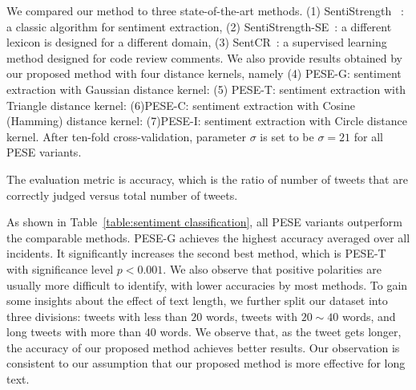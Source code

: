 \documentclass[runningheads]{llncs}
\begin{document}
We compared our method to three state-of-the-art methods. (1) SentiStrength ~\cite{sentistrength2010}: a classic algorithm for sentiment extraction, (2) SentiStrength-SE~\cite{Rakibul2017SentiStrength-SE}: a different lexicon is designed for a different domain, (3) SentCR~\cite{Ahmed2017SentiCR}:  a supervised learning method designed for code review comments. 
We also provide results obtained by our proposed method with four distance kernels, namely (4) PESE-G: sentiment extraction with Gaussian distance kernel: (5) PESE-T: sentiment extraction with Triangle distance kernel: (6)PESE-C: sentiment extraction with Cosine (Hamming) distance kernel: (7)PESE-I: sentiment extraction with Circle distance kernel. After ten-fold cross-validation, parameter $\sigma$ is set to be $\sigma=21$ for all PESE variants.

The evaluation metric is accuracy, which is the ratio of number of tweets that are correctly judged versus total number of tweets.

As shown in Table~\ref{table:sentiment classification}, all PESE variants outperform the comparable methods.
PESE-G achieves the highest accuracy averaged over all incidents. It significantly increases the second best method, which is PESE-T with significance level $p<0.001$.
We also observe that positive polarities are usually more difficult to identify, with lower accuracies by most methods. 
To gain some insights about the effect of text length, we further split our dataset into three divisions: tweets with less than $20$ words, tweets with $20\sim 40$ words, and long tweets with more than $40$ words.
We observe that, as the tweet gets longer, the accuracy of our proposed method achieves better results. Our observation is consistent to our assumption that our proposed method is more effective for long text.
\end{document}
